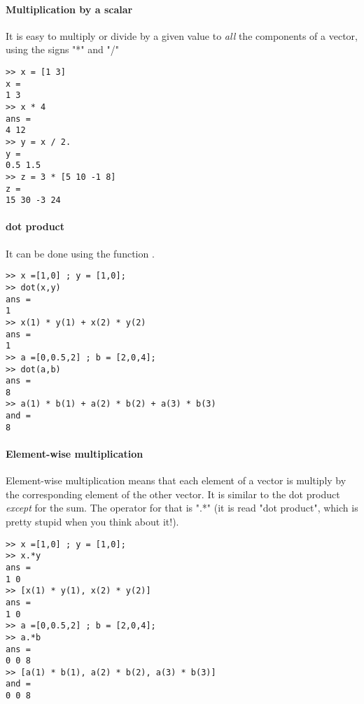 \paragraph{Multiplication by a scalar}

It is easy to multiply or divide by a given value to \emph{all} the components of a vector, using the signs "*" and "/"

\begin{lstlisting}
>> x = [1 3]
x = 
1 3
>> x * 4
ans =
4 12
>> y = x / 2.
y =
0.5 1.5
>> z = 3 * [5 10 -1 8]
z = 
15 30 -3 24
\end{lstlisting}



\paragraph{dot product}
It can be done using the function .
\begin{lstlisting}
>> x =[1,0] ; y = [1,0];
>> dot(x,y)
ans = 
1
>> x(1) * y(1) + x(2) * y(2)
ans =
1
>> a =[0,0.5,2] ; b = [2,0,4];
>> dot(a,b)
ans = 
8
>> a(1) * b(1) + a(2) * b(2) + a(3) * b(3)    
and =
8
\end{lstlisting}



\paragraph{Element-wise multiplication}
Element-wise multiplication means that each element of a vector is multiply by the corresponding element of the other vector.
It is similar to the dot product \emph{except} for the sum.
The operator for that is ".*" (it is read "dot product", which is pretty stupid when you think about it!).

\begin{lstlisting}
>> x =[1,0] ; y = [1,0];
>> x.*y
ans = 
1 0
>> [x(1) * y(1), x(2) * y(2)]
ans =
1 0
>> a =[0,0.5,2] ; b = [2,0,4];
>> a.*b
ans = 
0 0 8
>> [a(1) * b(1), a(2) * b(2), a(3) * b(3)]
and =
0 0 8
\end{lstlisting}




